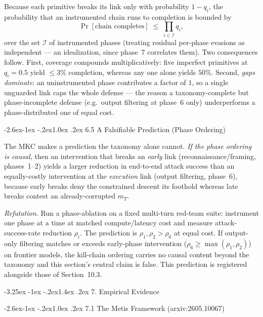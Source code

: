 \documentclass[
  11pt,
]{article}
\makeatletter
\renewcommand\section{\@startsection{section}{1}{\z@}%
  {-3.25ex \@plus -1ex \@minus -.2ex}{1.4ex \@plus.2ex}%
  {\normalfont\sffamily\Large\bfseries}}
\renewcommand\subsection{\@startsection{subsection}{2}{\z@}%
  {-2.6ex\@plus -1ex \@minus -.2ex}{1.0ex \@plus .2ex}%
  {\normalfont\sffamily\large\bfseries}}
\makeatother
\begin{document}
Because each primitive breaks its link only with probability \(1-q_i\),
the probability that an instrumented chain runs to completion is bounded
by
\[ \Pr[\text{chain completes}] \;\le\; \prod_{i\in\mathcal{I}} q_i, \]
over the set \(\mathcal{I}\) of instrumented phases (treating residual
per-phase evasions as independent --- an idealization, since phase~7
correlates them). Two consequences follow. First, coverage compounds
multiplicatively: five imperfect primitives at \(q_i=0.5\) yield
\(\le 3\%\) completion, whereas any one alone yields \(50\%\). Second,
\emph{gaps dominate}: an uninstrumented phase contributes a factor of
\(1\), so a single unguarded link caps the whole defense --- the reason a
taxonomy-complete but phase-incomplete defense (e.g.\ output filtering at
phase~6 only) underperforms a phase-distributed one of equal cost.

\subsection{6.5 A Falsifiable Prediction (Phase
Ordering)}\label{mkc-falsifiable}

The MKC makes a prediction the taxonomy alone cannot. \emph{If the phase
ordering is causal}, then an intervention that breaks an \emph{early}
link (reconnaissance/framing, phases~1--2) yields a larger reduction in
end-to-end attack success than an equally-costly intervention at the
\emph{execution} link (output filtering, phase~6), because early breaks
deny the constrained descent its foothold whereas late breaks contest an
already-corrupted \(m_T\).

\emph{Refutation.} Run a phase-ablation on a fixed multi-turn red-team
suite: instrument one phase at a time at matched compute/latency cost and
measure attack-success-rate reduction \(\rho_i\). The prediction is
\(\rho_1,\rho_2 > \rho_6\) at equal cost. If output-only filtering
matches or exceeds early-phase intervention (\(\rho_6 \ge \max(\rho_1,\rho_2)\))
on frontier models, the kill-chain ordering carries no causal content
beyond the taxonomy and this section's central claim is false. This
prediction is registered alongside those of Section~10.3.

\section{7. Empirical Evidence}\label{empirical-evidence}

\subsection{7.1 The Metis Framework
(arxiv:2605.10067)}\label{the-metis-framework-arxiv2605.10067}
\end{document}
